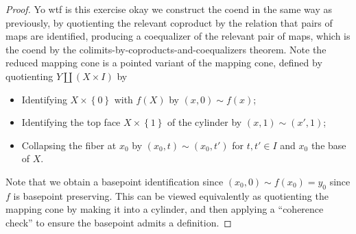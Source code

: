 \begin{proof}
	Yo wtf is this exercise okay we construct the coend in the same way as previously, by quotienting the relevant coproduct by the relation that pairs of maps are identified, producing a coequalizer of the relevant pair of maps, which is the coend by the colimits-by-coproducts-and-coequalizers theorem. Note the reduced mapping cone is a pointed variant of the mapping cone, defined by quotienting $Y\amalg (X\times I)$ by
	\begin{itemize}
		\item Identifying $X\times \left\{ 0 \right\} $ with $f(X)$ by $(x,0)\sim f(x)$;
		\item Identifying the top face $X\times \left\{ 1 \right\} $ of the cylinder by $(x,1)\sim (x',1)$;
		\item Collapsing the fiber at $x_0$ by $(x_0,t)\sim (x_0,t')$ for $t,t'\in I$ and $x_0$ the base of $X$.
	\end{itemize}
	Note that we obtain a basepoint identification since $(x_0,0)\sim f(x_0)=y_0$ since $f$ is basepoint preserving. This can be viewed equivalently as quotienting the mapping cone by making it into a cylinder, and then applying a ``coherence check'' to ensure the basepoint admits a definition.


\end{proof}
